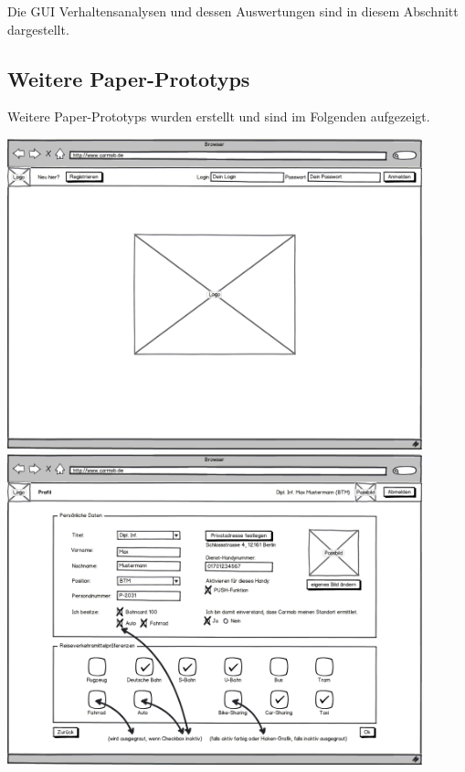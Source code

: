 \documentclass[12pt,a4paper]{article}
\begin{document}
Die GUI Verhaltensanalysen und dessen Auswertungen sind in diesem Abschnitt dargestellt.





\newpage
\vspace*{40mm}
\subsection{Weitere Paper-Prototyps}

Weitere Paper-Prototyps wurden erstellt und sind im Folgenden aufgezeigt.

\begin{center}
\includegraphics[width=12cm]{08_konvergenter_paperprototyp01_000.png}\\
\includegraphics[width=12cm]{08_konvergenter_paperprototyp01_001.png}\\

\end{center}
\end{document}
